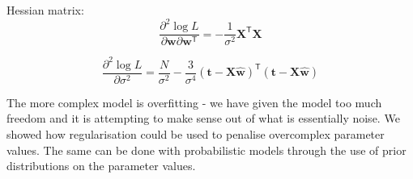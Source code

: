 \documentclass[a4paper,11pt]{article} %
\begin{document}
Hessian matrix:
\begin{equation}
\frac{\partial^2 \log L}{\partial\mathbf{w}\partial\mathbf{w}^{\mathsf{T}}} =
-\frac{1}{\sigma^2}\mathbf{X}^{\mathsf{T}}\mathbf{X}
\end{equation}

\begin{equation}
\frac{\partial^2\log L}{\partial \sigma^2} = \frac{N}{\sigma^2} -
\frac{3}{\sigma^4}(\mathbf{t} - \mathbf{X}\hat{\mathbf{w}})^{\mathsf{T}}
(\mathbf{t} - \mathbf{X}\hat{\mathbf{w}})
\end{equation}

The more complex model is overfitting - we have given the model too
much freedom and it is attempting to make sense out of what is essentially noise.
We showed how regularisation could be used to penalise overcomplex
parameter values. The same can be done with probabilistic models through the use
of prior distributions on the parameter values.




\end{document}
